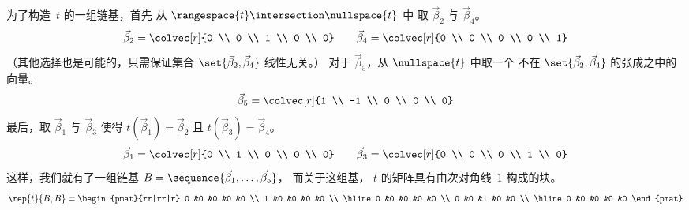 为了构造~$t$ 的一组链基，首先
从 \( \rangespace{t}\intersection\nullspace{t} \) 中
取 \( \vec{\beta}_2 \) 与 \( \vec{\beta}_4 \)。
\begin{equation*}
  \vec{\beta}_2=\colvec[r]{0 \\ 0 \\ 1 \\ 0 \\ 0}\qquad
  \vec{\beta}_4=\colvec[r]{0 \\ 0 \\ 0 \\ 0 \\ 1}
\end{equation*}
（其他选择也是可能的，只需保证集合
\( \set{\vec{\beta}_2,\vec{\beta}_4} \) 线性无关。）
对于 \( \vec{\beta}_5 \)，从 \( \nullspace{t} \) 中取一个
不在 \( \set{ \vec{\beta}_2,\vec{\beta}_4 } \) 的张成之中的向量。
\begin{equation*}
  \vec{\beta}_5=\colvec[r]{1 \\ -1 \\ 0 \\ 0 \\ 0}
\end{equation*}
最后，取 \( \vec{\beta}_1 \) 与 \( \vec{\beta}_3 \) 使得
\( t(\vec{\beta}_1)=\vec{\beta}_2 \) 且
\( t(\vec{\beta}_3)=\vec{\beta}_4 \)。
\begin{equation*}
  \vec{\beta}_1=\colvec[r]{0 \\ 1 \\ 0 \\ 0 \\ 0}\qquad
  \vec{\beta}_3=\colvec[r]{0 \\ 0 \\ 0 \\ 1 \\ 0}
\end{equation*}
这样，我们就有了一组链基
\( B=\sequence{\vec{\beta}_1,\ldots,\vec{\beta}_5} \)，
而关于这组基，
$t$ 的矩阵具有由次对角线~$1$ 构成的块。
\begin{equation*}
  \rep{t}{B,B}=
  \begin{pmat}{rr|rr|r}
    0  &0  &0  &0  &0  \\
    1  &0  &0  &0  &0  \\  \hline
    0  &0  &0  &0  &0  \\
    0  &0  &1  &0  &0  \\  \hline
    0  &0  &0  &0  &0
  \end{pmat}
\end{equation*}

